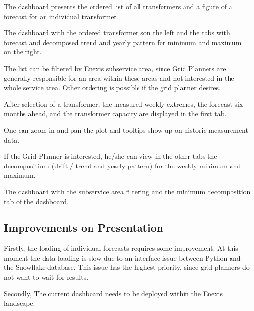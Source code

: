 \documentclass[letterpaper,10pt,english]{sphinxmanual}
\let\sphinxpxdimen\pdfpxdimen\else\newdimen\sphinxpxdimen
\begin{document}
The dashboard presents the ordered list of all transformers and a figure of a forecast for an individual transformer.
\begin{quote}

\noindent{\hspace*{\fill}\sphinxincludegraphics[width=800\sphinxpxdimen]{{dashboard}.png}\hspace*{\fill}}
\end{quote}

The dashboard with the ordered transformer son the left and the tabs with forecast and decomposed trend and yearly pattern for minimum and maximum on the right.

The list can be filtered by Enexis sub\sphinxhyphen{}service area, since Grid Planners are generally responsible for an area within these areas and not interested in the whole service area.
Other ordering is possible if the grid planner desires.

After selection of a transformer, the measured weekly extremes, the forecast six months ahead, and the transformer capacity are displayed in the first tab.

One can zoom in and pan the plot and tooltips show up on historic measurement data.

If the Grid Planner is interested, he/she can view in the other tabs the decompositions (drift / trend and yearly pattern) for the weekly minimum and maximum.
\begin{quote}

\noindent{\hspace*{\fill}\sphinxincludegraphics[width=800\sphinxpxdimen]{{dashboard_min}.png}\hspace*{\fill}}
\end{quote}

The dashboard with the sub\sphinxhyphen{}service area filtering and the minimum decomposition tab of the dashboard.


\subsection{Improvements on Presentation}
\label{\detokenize{evaluation:improvements-on-presentation}}
Firstly, the loading of individual forecasts requires some improvement. At this moment the data loading is slow due to an interface issue between Python and the Snowflake database.
This issue has the highest priority, since grid planners do not want to wait for results.

Secondly, The current dashboard needs to be deployed within the Enexis landscape.
\end{document}
